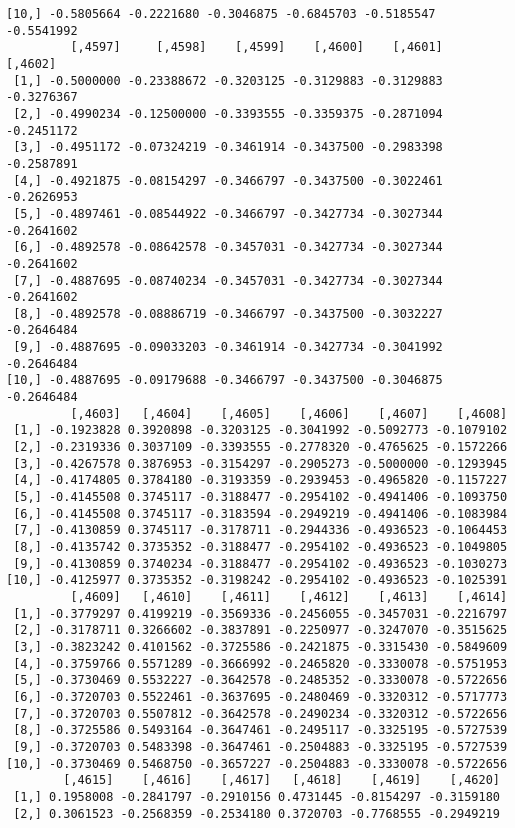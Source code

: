 \documentclass[
  letterpaper,
  DIV=11,
  numbers=noendperiod]{scrreprt}
\begin{document}
\begin{verbatim}
[10,] -0.5805664 -0.2221680 -0.3046875 -0.6845703 -0.5185547 -0.5541992
         [,4597]     [,4598]    [,4599]    [,4600]    [,4601]    [,4602]
 [1,] -0.5000000 -0.23388672 -0.3203125 -0.3129883 -0.3129883 -0.3276367
 [2,] -0.4990234 -0.12500000 -0.3393555 -0.3359375 -0.2871094 -0.2451172
 [3,] -0.4951172 -0.07324219 -0.3461914 -0.3437500 -0.2983398 -0.2587891
 [4,] -0.4921875 -0.08154297 -0.3466797 -0.3437500 -0.3022461 -0.2626953
 [5,] -0.4897461 -0.08544922 -0.3466797 -0.3427734 -0.3027344 -0.2641602
 [6,] -0.4892578 -0.08642578 -0.3457031 -0.3427734 -0.3027344 -0.2641602
 [7,] -0.4887695 -0.08740234 -0.3457031 -0.3427734 -0.3027344 -0.2641602
 [8,] -0.4892578 -0.08886719 -0.3466797 -0.3437500 -0.3032227 -0.2646484
 [9,] -0.4887695 -0.09033203 -0.3461914 -0.3427734 -0.3041992 -0.2646484
[10,] -0.4887695 -0.09179688 -0.3466797 -0.3437500 -0.3046875 -0.2646484
         [,4603]   [,4604]    [,4605]    [,4606]    [,4607]    [,4608]
 [1,] -0.1923828 0.3920898 -0.3203125 -0.3041992 -0.5092773 -0.1079102
 [2,] -0.2319336 0.3037109 -0.3393555 -0.2778320 -0.4765625 -0.1572266
 [3,] -0.4267578 0.3876953 -0.3154297 -0.2905273 -0.5000000 -0.1293945
 [4,] -0.4174805 0.3784180 -0.3193359 -0.2939453 -0.4965820 -0.1157227
 [5,] -0.4145508 0.3745117 -0.3188477 -0.2954102 -0.4941406 -0.1093750
 [6,] -0.4145508 0.3745117 -0.3183594 -0.2949219 -0.4941406 -0.1083984
 [7,] -0.4130859 0.3745117 -0.3178711 -0.2944336 -0.4936523 -0.1064453
 [8,] -0.4135742 0.3735352 -0.3188477 -0.2954102 -0.4936523 -0.1049805
 [9,] -0.4130859 0.3740234 -0.3188477 -0.2954102 -0.4936523 -0.1030273
[10,] -0.4125977 0.3735352 -0.3198242 -0.2954102 -0.4936523 -0.1025391
         [,4609]   [,4610]    [,4611]    [,4612]    [,4613]    [,4614]
 [1,] -0.3779297 0.4199219 -0.3569336 -0.2456055 -0.3457031 -0.2216797
 [2,] -0.3178711 0.3266602 -0.3837891 -0.2250977 -0.3247070 -0.3515625
 [3,] -0.3823242 0.4101562 -0.3725586 -0.2421875 -0.3315430 -0.5849609
 [4,] -0.3759766 0.5571289 -0.3666992 -0.2465820 -0.3330078 -0.5751953
 [5,] -0.3730469 0.5532227 -0.3642578 -0.2485352 -0.3330078 -0.5722656
 [6,] -0.3720703 0.5522461 -0.3637695 -0.2480469 -0.3320312 -0.5717773
 [7,] -0.3720703 0.5507812 -0.3642578 -0.2490234 -0.3320312 -0.5722656
 [8,] -0.3725586 0.5493164 -0.3647461 -0.2495117 -0.3325195 -0.5727539
 [9,] -0.3720703 0.5483398 -0.3647461 -0.2504883 -0.3325195 -0.5727539
[10,] -0.3730469 0.5468750 -0.3657227 -0.2504883 -0.3330078 -0.5722656
        [,4615]    [,4616]    [,4617]   [,4618]    [,4619]    [,4620]
 [1,] 0.1958008 -0.2841797 -0.2910156 0.4731445 -0.8154297 -0.3159180
 [2,] 0.3061523 -0.2568359 -0.2534180 0.3720703 -0.7768555 -0.2949219

\end{verbatim}
\end{document}
